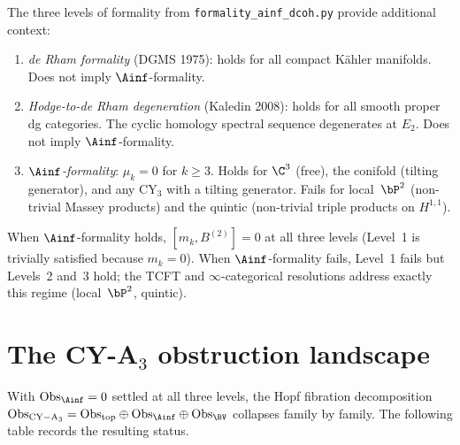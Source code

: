 \begin{remark}
\label{rem:formality-three-levels}
The three levels of formality from
\texttt{formality\_ainf\_dcoh.py} provide additional context:
\begin{enumerate}[label=\textup{(\roman*)}]
 \item \emph{de Rham formality} (DGMS 1975): holds for all compact
  K\"ahler manifolds.  Does not imply $\Ainf$-formality.
 \item \emph{Hodge-to-de Rham degeneration} (Kaledin 2008):
  holds for all smooth proper dg categories.  The cyclic
  homology spectral sequence degenerates at $E_2$.  Does not
  imply $\Ainf$-formality.
 \item \emph{$\Ainf$-formality}: $\mu_k = 0$ for $k \geq 3$.
  Holds for $\C^3$ (free), the conifold (tilting generator),
  and any CY$_3$ with a tilting generator.  Fails for
  local~$\bP^2$ (non-trivial Massey products) and the quintic
  (non-trivial triple products on $H^{1,1}$).
\end{enumerate}
When $\Ainf$-formality holds, $[m_k, B^{(2)}] = 0$ at all three
levels (Level~1 is trivially satisfied because $m_k = 0$).
When $\Ainf$-formality fails, Level~1 fails but Levels~2 and~3
hold; the TCFT and $\infty$-categorical resolutions address
exactly this regime (local~$\bP^2$, quintic).
\end{remark}


\section{The CY-A$_3$ obstruction landscape}
\label{sec:m3b2-landscape}

With $\mathrm{Obs}_{\Ainf} = 0$ settled at all three levels, the
Hopf fibration decomposition
$\mathrm{Obs}_{\mathrm{CY-A}_3}
 = \mathrm{Obs}_{\mathrm{top}} \oplus \mathrm{Obs}_{\Ainf}
  \oplus \mathrm{Obs}_{\BV}$
collapses family by family.  The following table records the
resulting status.

